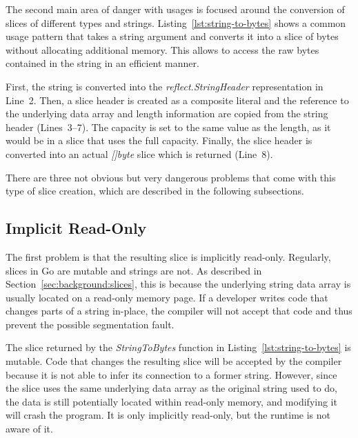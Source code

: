 The second main area of danger with \unsafe{} usages is focused around the conversion of slices of different types and
strings.
Listing~\ref{lst:string-to-bytes} shows a common \unsafe{} usage pattern that takes a string argument and converts it
into a slice of bytes without allocating additional memory.
This allows to access the raw bytes contained in the string in an efficient manner.



First, the string is converted into the \textit{reflect.StringHeader} representation in Line~2.
Then, a slice header is created as a composite literal and the reference to the underlying data array and length
information are copied from the string header (Lines~3--7).
The capacity is set to the same value as the length, as it would be in a slice that uses the full capacity.
Finally, the slice header is converted into an actual \textit{[]byte} slice which is returned (Line~8).

There are three not obvious but very dangerous problems that come with this type of slice creation, which are described
in the following subsections.


\subsection{Implicit Read-Only}\label{subsec:unsafe-security-problems:slice-casts:read-only}

The first problem is that the resulting slice is implicitly read-only.
Regularly, slices in Go are mutable and strings are not.
As described in Section~\ref{sec:background:slices}, this is because the underlying string data array is usually located
on a read-only memory page.
If a developer writes code that changes parts of a string in-place, the compiler will not accept that code and thus
prevent the possible segmentation fault.

The slice returned by the \textit{StringToBytes} function in Listing~\ref{lst:string-to-bytes} is mutable.
Code that changes the resulting slice will be accepted by the compiler because it is not able to infer its connection to
a former string.
However, since the slice uses the same underlying data array as the original string used to do, the data is still
potentially located within read-only memory, and modifying it will crash the program.
It is only implicitly read-only, but the runtime is not aware of it.

